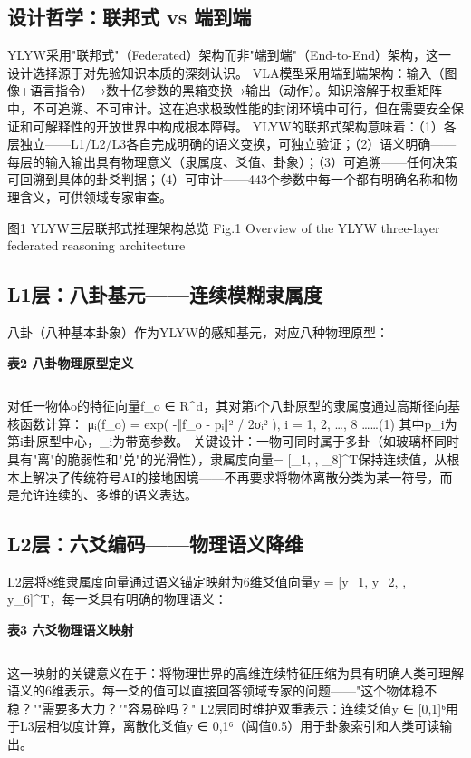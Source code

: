 \documentclass[12pt,a4paper]{article}
\begin{document}
\subsection{设计哲学：联邦式 vs 端到端}
YLYW采用"联邦式"（Federated）架构而非"端到端"（End-to-End）架构，这一设计选择源于对先验知识本质的深刻认识。
VLA模型采用端到端架构：输入（图像+语言指令）→数十亿参数的黑箱变换→输出（动作）。知识溶解于权重矩阵中，不可追溯、不可审计。这在追求极致性能的封闭环境中可行，但在需要安全保证和可解释性的开放世界中构成根本障碍。
YLYW的联邦式架构意味着：（1）各层独立——L1/L2/L3各自完成明确的语义变换，可独立验证；（2）语义明确——每层的输入输出具有物理意义（隶属度、爻值、卦象）；（3）可追溯——任何决策可回溯到具体的卦爻判据；（4）可审计——443个参数中每一个都有明确名称和物理含义，可供领域专家审查。

图1  YLYW三层联邦式推理架构总览
Fig.1  Overview of the YLYW three-layer federated reasoning architecture

\subsection{L1层：八卦基元——连续模糊隶属度}
八卦（八种基本卦象）作为YLYW的感知基元，对应八种物理原型：

\begin{center}
\textbf{表2  八卦物理原型定义}
\begin{tabular}{lcccc}
\hline
\end{tabular}
\end{center}
对任一物体o的特征向量f\_o ∈ R^d，其对第i个八卦原型的隶属度通过高斯径向基核函数计算：
μᵢ(f\_o) = exp( -‖f\_o - pᵢ‖² / 2σᵢ² ),  i = 1, 2, …, 8  ……(1)
其中p\_i为第i卦原型中心，\_i为带宽参数。
关键设计：一物可同时属于多卦（如玻璃杯同时具有"离"的脆弱性和"兑"的光滑性），隶属度向量= [\_1, , \_8]^T保持连续值，从根本上解决了传统符号AI的接地困境——不再要求将物体离散分类为某一符号，而是允许连续的、多维的语义表达。

\subsection{L2层：六爻编码——物理语义降维}
L2层将8维隶属度向量通过语义锚定映射为6维爻值向量y = [y\_1, y\_2, , y\_6]^T，每一爻具有明确的物理语义：

\begin{center}
\textbf{表3  六爻物理语义映射}
\begin{tabular}{lcccc}
\hline
\end{tabular}
\end{center}
这一映射的关键意义在于：将物理世界的高维连续特征压缩为具有明确人类可理解语义的6维表示。每一爻的值可以直接回答领域专家的问题——"这个物体稳不稳？""需要多大力？""容易碎吗？"
L2层同时维护双重表示：连续爻值y ∈ [0,1]⁶用于L3层相似度计算，离散化爻值y ∈ {0,1}⁶（阈值0.5）用于卦象索引和人类可读输出。
\end{document}
